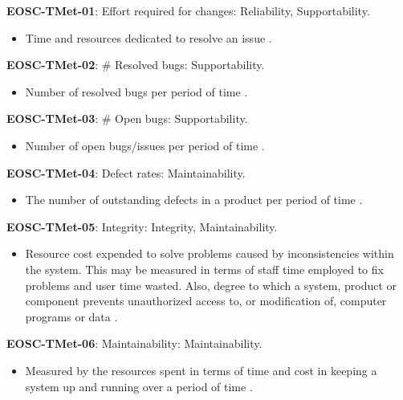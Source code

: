 \textbf{EOSC-TMet-01}: Effort required for changes: Reliability, Supportability.

\begin{itemize}
    \item Time and resources dedicated to resolve an issue \cite{montagud_systematic_2012}.
\end{itemize}

\textbf{EOSC-TMet-02}: \# Resolved bugs: Supportability.

\begin{itemize}
    \item Number of resolved bugs per period of time \cite{montagud_systematic_2012}.
\end{itemize}

\textbf{EOSC-TMet-03}: \# Open bugs: Supportability.

\begin{itemize}
    \item Number of open bugs/issues per period of time \cite{montagud_systematic_2012}.
\end{itemize}

\textbf{EOSC-TMet-04}: Defect rates: Maintainability.

\begin{itemize}
    \item The number of outstanding defects in a product per period of time \cite{crispin_driving_2006}.
\end{itemize}

\textbf{EOSC-TMet-05}: Integrity: Integrity, Maintainability.

\begin{itemize}
    \item Resource cost expended to solve problems caused by inconsistencies within the system. This may be measured in terms of staff time employed to fix problems and user time wasted. Also, degree to which a system, product or component prevents unauthorized access to, or modification of, computer programs or data \cite{iso_25010_2011_2017,gillies_modelling_1992}.
\end{itemize}

\textbf{EOSC-TMet-06}: Maintainability: Maintainability.

\begin{itemize}
    \item Measured by the resources spent in terms of time and cost in keeping a system up and running over a period of time \cite{gillies_modelling_1992,boehm_quantitative_1976}.
\end{itemize}

